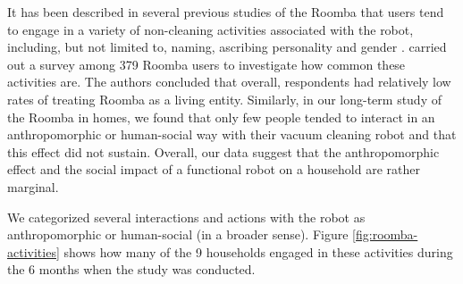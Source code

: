 \documentclass{frontiersSCNS} %
\begin{document}
It has been described in several previous studies of the Roomba that users tend
to engage in a variety of non-cleaning activities associated with the robot,
including, but not limited to, naming, ascribing personality and gender
\citep{forlizzi_service_2006,forlizzi_how_2007,krumm_my_2007,sung_domestic_2010}.
\cite{sung_housewives_2008} carried out a survey among 379 Roomba users to
investigate how common these activities are. The authors concluded that overall,
respondents had relatively low rates of treating Roomba as a living entity.  
Similarly, in our long-term study of the Roomba in homes, we found that only few 
people tended to interact in an anthropomorphic or human-social way with their 
vacuum cleaning robot and that this effect did not sustain. Overall, our data 
suggest that the anthropomorphic effect and the social
impact of a functional robot on a household are rather marginal.

We categorized several interactions and actions with the robot as
anthropomorphic or human-social (in a broader sense). 
Figure \ref{fig:roomba-activities} shows how many of the 9 households engaged
in these activities during the 6 months when the study was conducted. 

%
\end{document}
